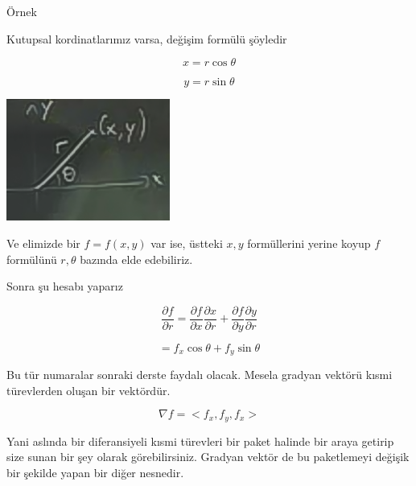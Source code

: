 \documentclass[12pt,fleqn]{article}\usepackage{../../common}
\begin{document}
Örnek

Kutupsal kordinatlarımız varsa, değişim formülü şöyledir

$$ x = r \cos \theta $$

$$ y = r \sin \theta $$

\includegraphics[height=4cm]{11_1.png}

Ve elimizde bir $f=f(x,y)$ var ise, üstteki $x,y$ formüllerini yerine koyup $f$
formülünü $r,\theta$ bazında elde edebiliriz.

Sonra şu hesabı yaparız

$$ 
\frac{\partial f}{\partial r} = 
\frac{\partial f}{\partial x}
\frac{\partial x}{\partial r} +
\frac{\partial f}{\partial y}
\frac{\partial y}{\partial r}
$$

$$ = f_x\cos \theta + f_y \sin \theta $$

Bu tür numaralar sonraki derste faydalı olacak. Mesela gradyan vektörü
kısmi türevlerden oluşan bir vektördür. 

$$ \nabla f = < f_x,f_y,f_x > $$

Yani aslında bir diferansiyeli kısmi türevleri bir paket halinde bir araya
getirip size sunan bir şey olarak görebilirsiniz. Gradyan vektör de bu
paketlemeyi değişik bir şekilde yapan bir diğer nesnedir. 
\end{document}
